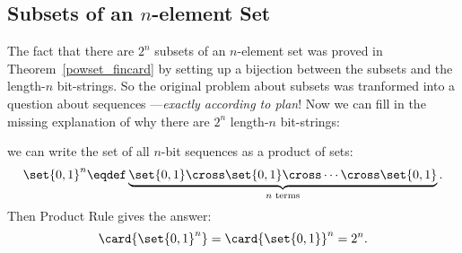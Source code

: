 \subsection{Subsets of an $n$-element Set}\label{2nsubsets}

\iffalse

How many different subsets of an $n$-element set $X$ are there?  For
example, the set $X = \set{x_1, x_2, x_3}$ has eight different subsets:
%
\[
\begin{array}{cccc}
\emptyset & \set{x_1} & \set{x_2} & \set{x_1, x_2} \\
\set{x_3} & \set{x_1, x_3} & \set{x_2, x_3} & \set{x_1, x_2, x_3}.
\end{array}
\]

There is a natural bijection from subsets of $X$ to $n$-bit sequences.
Let $x_1, x_2, \ldots, x_n$ be the elements of $X$.  Then a particular
subset of $X$ maps to the sequence $(b_1, \ldots, b_n)$ where $b_i =
1$ if and only if $x_i$ is in that subset.  For example, if $n = 10$,
then the subset $\set{x_2, x_3, x_5, x_7, x_{10}}$ maps to a 10-bit
sequence as follows:
%
\[
\begin{array}{rrrrrrrrrrrrr}
\text{subset:} &
\{ &    & x_2, & x_3, &    & x_5, &   & x_7, &    &    & x_{10} & \} \\
\text{sequence:} &
(  & 0, &   1, &   1, & 0, &   1, & 0, &   1, & 0, & 0, &        1 & )
\end{array}
\]
\fi

The fact that there are $2^n$ subsets of an $n$-element set was proved
in Theorem~\ref{powset_fincard} by setting up a bijection between the
subsets and the length-$n$ bit-strings.  So the original problem about
subsets was tranformed into a question about sequences
---\emph{exactly according to plan}!  Now we can fill in the missing
explanation of why there are $2^n$ length-$n$ bit-strings:
\iffalse
Now if we answer the sequence
question, then we've solved our original problem as well.

But how many different $n$-bit sequences are there?  For example,
there are 8 different 3-bit sequences:
%
\[
\begin{array}{ccccccc}
(0,0,0) & \quad & (0,0,1) & \quad & (0,1,0) & \quad & (0,1,1) \\
(1,0,0) & \quad & (1,0,1) & \quad & (1,1,0) & \quad & (1,1,1)
\end{array}
\]

Well,\fi
we can write the set of all $n$-bit sequences as a product of
sets:
%
\[
\set{0,1}^n \eqdef \underbrace{\set{0,1} \cross \set{0,1} \cross
        \cdots \cross \set{0,1}}_{\text{$n$ terms}}.
\]
%
Then Product Rule gives the answer:
%
\[
\card{\set{0,1}^n} = \card{\set{0,1}}^n  = 2^n.
\]



